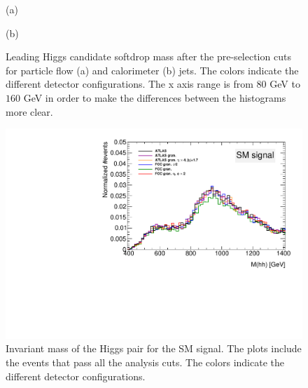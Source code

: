 \begin{figure}
	\begin{minipage}[t]{0.5\textwidth}
		\caption*{(a)}
		\label{fig:CompGran_M}
	\end{minipage}%
	\hfill
	\begin{minipage}[t]{0.5\textwidth}
		\caption*{(b)}
	\end{minipage}
	\caption{Leading Higgs candidate softdrop mass after the pre-selection cuts for particle flow (a) and calorimeter (b) jets. The colors indicate the different detector configurations. The x axis range is from $80$ GeV to $160$ GeV in order to make the differences between the histograms more clear.}
	\label{fig:CompGran}
\end{figure}

\begin{figure}
	\centering
	\includegraphics[width=0.5\linewidth]{./Figures/Mhh_after.pdf}
	\caption{Invariant mass of the Higgs pair for the SM signal. The plots include the events that pass all the analysis cuts. The colors indicate the different detector configurations.}
	\label{fig:CompGran_Mhh}
\end{figure}

